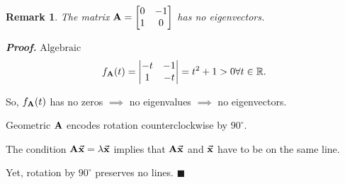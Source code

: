 \documentclass[12pt, a4paper]{article}
\newtheorem*{rmk}{\indent Remark}
\newenvironment*{prf}{\par\indent\textbf{\textit{Proof. }}}{\hfill $\blacksquare$\par}
\def\R{{\mathbb{R}}}
\def\vecx{\va{x}}
\def\matrixA{\vb{A}}
\begin{document}
\begin{rmk} The matrix $\matrixA=\mqty[0&-1\\1&0]$ has no eigenvectors.\end{rmk}
\begin{prf}
	$\boxed{\text{Algebraic}}$ \[f_{\matrixA}(t)=\mqty|{-t&-1\\1&-t}|=t^2+1>0\forall t\in\R.\]\par So, $f_{\matrixA}(t)$ has no zeros $\implies$ no eigenvalues $\implies$ no eigenvectors.\par $\boxed{\text{Geometric}}$ $\matrixA$ encodes rotation counterclockwise by $90^\circ.$\par  The condition $\matrixA\vecx=\lambda\vecx$ implies that $\matrixA\vecx$ and $\vecx$ have to be on the same line.\par  Yet, rotation by $90^\circ$ preserves no lines.
\end{prf}
\end{document}

